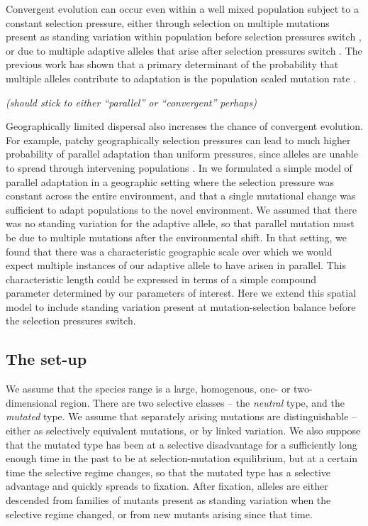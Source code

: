 \documentclass{article}
\newcommand{\plr}[1]{{\it\color{blue}(#1)}}
\begin{document}
Convergent evolution can occur even within a well mixed population
subject to a constant selection pressure, 
either through selection on multiple mutations present as standing variation within population
before selection pressures switch \citep{Orr:01,softsweepsI},
or due to multiple adaptive alleles that arise after selection pressures switch \citet{softsweepsII}. 
The previous work has shown that 
a primary determinant of the probability that multiple alleles contribute to adaptation
is the population scaled mutation rate \citep[see ][ for a review]{MesserPetrov}. 

\plr{should stick to either ``parallel'' or ``convergent'' perhaps}

Geographically limited dispersal also increases the chance of convergent evolution. 
For example, 
patchy geographically selection pressures can lead to much higher probability of parallel adaptation than uniform pressures,
since alleles are unable to spread through intervening populations \citep{RalphCoop:14}. 
In \citep{RalphCoop} we formulated a simple model of parallel adaptation in a geographic setting
where the selection pressure was constant across the entire environment, 
and that a single mutational change was sufficient to adapt populations to the novel environment. 
We assumed that there was no standing variation for the adaptive allele, 
so that parallel mutation must be due to multiple mutations after the environmental shift. 
In that setting, 
we found that there was a characteristic geographic scale over which we would expect 
multiple instances of our adaptive allele to have arisen in parallel. 
This characteristic length could be expressed in terms of a simple compound
parameter determined by our parameters of interest. 
Here we extend this spatial model to include standing variation 
present at mutation-selection balance before the selection pressures switch.


\subsection{The set-up}


We assume that the species range
is a large, homogenous, one- or two-dimensional region. 
There are two selective classes -- the {\em neutral} type, and the {\em mutated} type.
We assume that separately arising mutations are distinguishable --
either as selectively equivalent mutations, or by linked variation.
We also suppose that 
the mutated type has been at a selective disadvantage 
for a sufficiently long enough time in the past to be at selection-mutation equilibrium,
but at a certain time the selective regime changes, so that the mutated type has a selective advantage and quickly spreads to fixation.
After fixation, alleles are either descended
from families of mutants present as standing variation when the selective regime changed,
or from new mutants arising since that time.
\end{document}
